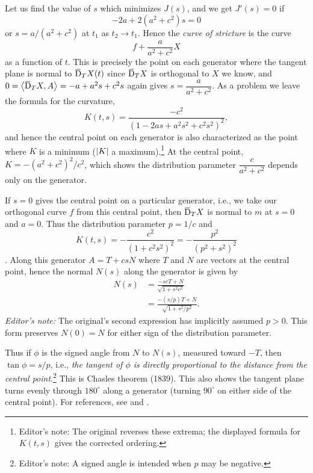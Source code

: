 \documentclass[../main]{subfiles}
\begin{document}
Let us find the value of $s$ which minimizes $J(s)$, and we get $J'(s) = 0$ if
\[ -2a+2(a^2+c^2)s= 0\]
or $s = a/(a^2+c^2)$ at $t_1$ as $t_2 \to t_1$. Hence the \emph{curve of stricture} is the curve
\[ f+\frac{a}{a^2+c^2}X \]
as a function of $t$. This is precisely the point on each generator where the tangent plane is normal to $\covariant_TX(t)$ since $\covariant_TX$ is orthogonal to $X$ we know, and\newline $0 = \ip{\covariant_TX}{A} = -a+a^2s+c^2s$ again gives $s=\dfrac{a}{a^2+c^2}$. As a problem we leave the formula for the curvature,
\[ K(t, s) = \frac{-c^2}{(1-2as+a^2s^2+c^2s^2)^2}, \]
and hence the central point on each generator is also characterized as the point where $K$ is a minimum ($\left|K\right|$ a maximum).\footnote{Editor's note: The original reverses these extrema; the displayed formula for $K(t,s)$ gives the corrected ordering.} At the central point, \newline $K = -(a^2+c^2)^2/c^2$, which shows the distribution parameter $\dfrac{c}{a^2+c^2}$ depends only on the generator.

If $s=0$ gives the central point on a particular generator, i.e., we take our orthogonal curve $f$ from this central point, then $\covariant_TX$ is normal to $m$ at $s=0$ and $a=0$. Thus the distribution parameter $p=1/c$ and \[K(t,s) = -\dfrac{c^2}{(1+c^2s^2)^2}=-\dfrac{p^2}{(p^2+s^2)^2}\]. Along this generator $A = T+csN$ where $T$ and $N$ are vectors at the central point, hence the normal $N(s)$ along the generator is given by
\[ 
\begin{aligned}
N(s) &= \frac{-scT + N}{\sqrt{1+s^2c^2}} \\
&= \frac{-(s/p)T + N}{\sqrt{1+s^2/p^2}}.
\end{aligned}
\]
\noindent\emph{Editor's note:} The original's second expression has implicitly assumed $p>0$. This form preserves $N(0)=N$ for either sign of the distribution parameter.


Thus if $\phi$ is the signed angle from $N$ to $N(s)$, measured toward $-T$, then $\tan \phi = s/p$, i.e., \emph{the tangent of $\phi$ is directly proportional to the distance from the central point}.\footnote{Editor's note: A signed angle is intended when $p$ may be negative.} This is Chasles theorem (1839). This also shows the tangent plane turns evenly through $180^\circ$ along a generator (turning $90^\circ$ on either side of the central point). For references, see \cite[p. 189]{struik1961lectures} and \cite[p. 107]{willmore1959introduction}.
\end{document}
